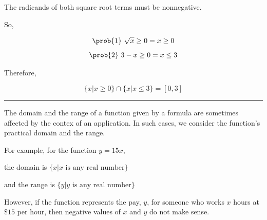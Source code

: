 \documentclass{report}
\begin{document}
\pagebreak
{}
\bigbreak \noindent \bigbreak \noindent
{}
\vspace{4mm}

\sol{}
\vspace{2mm}

The radicands of both square root terms must be nonnegative.
\vspace{3mm}

So,

$$ \text{\prob{1} }\sqrt{x} \ge 0 = x \ge 0$$
$$\text{\prob{2} } 3-x \ge 0 = x \le 3$$

Therefore, 

$$ \{x | x \ge 0\} \cap \{x|x \le 3\} = [0,3]$$
\vspace{3mm}

\hrule
\bigbreak \noindent
{}
\bigbreak \noindent
The domain and the range of a function given by a formula are sometimes affected by the contex of an application. In such cases, we consider the function's practical domain and the range.
\vspace{5mm}

For example, for the function $y = 15x$, 
\vspace{2mm}

the domain is $\{x|x \text{ is any real number}\}$ 
\vspace{2mm}

and the range is $\{y|y \text{ is any real number}\}$
\vspace{5mm}

\noindent However, if the function represents the pay, $y$, for someone who works $x$ hours at $\$15$ per hour, then negative values of $x$ and $y$ do not make sense.
\vspace{4mm}
\end{document}
